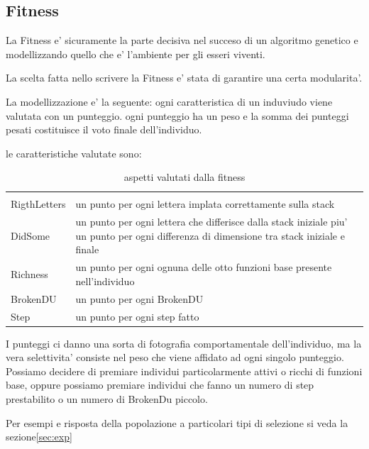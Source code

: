 \documentclass[12pt, a4paper]{article}
\begin{document}
\subsection{Fitness}
\label{sec:fit}
La Fitness e' sicuramente la parte decisiva nel succeso di un algoritmo genetico e modellizzando quello che e' l'ambiente per gli esseri viventi.

La scelta fatta nello scrivere la Fitness e' stata di garantire una certa modularita'.

La modellizzazione e' la seguente: ogni caratteristica di un induviudo viene valutata con un punteggio.
ogni punteggio ha un peso e la somma dei punteggi pesati costituisce il voto finale dell'individuo.

le caratteristiche valutate sono:
\begin{table}[h]
\begin{tabular}{|l|p{10.0cm}|}
\hline	\\
RigthLetters	&	un punto per ogni lettera implata correttamente sulla stack	\\
DidSome			&	un punto per ogni lettera che differisce dalla stack iniziale piu' un punto per ogni differenza di dimensione tra stack iniziale e finale	\\
Richness		&	un punto per ogni ognuna delle otto funzioni base presente nell'individuo	\\
BrokenDU		&	un punto per ogni BrokenDU	\\
Step			&	un punto per ogni step fatto	\\
\hline
\end{tabular}
\caption{aspetti valutati dalla fitness}
\label{table:fitfunc}
\end{table}

I punteggi ci danno una sorta di fotografia comportamentale dell'individuo, ma la vera selettivita' consiste nel peso che viene affidato ad ogni singolo punteggio.
Possiamo decidere di premiare individui particolarmente attivi o ricchi di funzioni base, oppure possiamo premiare individui che fanno un numero di step prestabilito o un numero di BrokenDu piccolo.

Per esempi e risposta della popolazione a particolari tipi di selezione si veda la sezione\ref{sec:exp}
\end{document}
